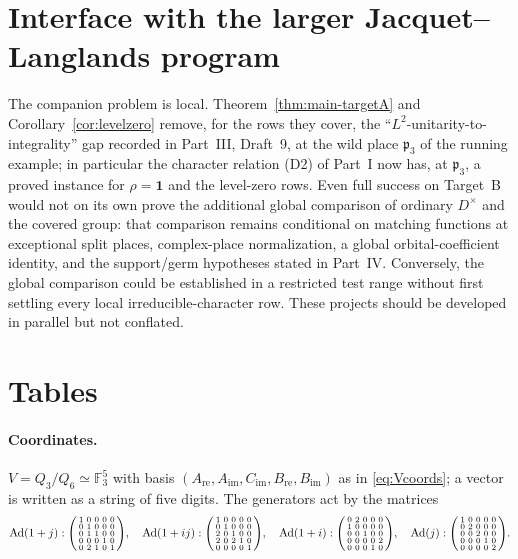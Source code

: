\documentclass[11pt]{article}
\newcommand{\Fq}{\mathbb F}
\newcommand{\Ad}{\operatorname{Ad}}
\newcommand{\pfr}{\mathfrak p}
\theoremstyle{plain}
\theoremstyle{definition}
\begin{document}
\section{Interface with the larger Jacquet--Langlands program}
The companion problem is local.  Theorem~\ref{thm:main-targetA} and
Corollary~\ref{cor:levelzero} remove, for the rows they cover, the
``$L^2$-unitarity-to-integrality'' gap recorded in Part~III, Draft~9,
at the wild place $\pfr_3$ of the running example; in particular the
character relation (D2) of Part~I now has, at $\pfr_3$, a proved
instance for $\rho=\mathbf1$ and the level-zero rows.  Even full
success on Target~B would not on its own prove the additional global
comparison of ordinary $D^\times$ and the covered group: that comparison
remains conditional on matching functions at exceptional split places,
complex-place normalization, a global orbital-coefficient identity,
and the support/germ hypotheses stated in Part~IV.  Conversely, the
global comparison could be established in a restricted test range
without first settling every local irreducible-character row.  These
projects should be developed in parallel but not conflated.

\appendix
\section{Tables}\label{app:tables}
\paragraph{Coordinates.}  $V=Q_3/Q_6\simeq\Fq_3^5$ with basis
$(A_{\mathrm{re}},A_{\mathrm{im}},C_{\mathrm{im}},B_{\mathrm{re}},B_{\mathrm{im}})$
as in \eqref{eq:Vcoords}; a vector is written as a string of five
digits.  The generators act by the matrices
\[
\Ad(1+j):\begin{psmallmatrix}1&0&0&0&0\\0&1&0&0&0\\0&1&1&0&0\\0&0&0&1&0\\0&2&1&0&1\end{psmallmatrix},\quad
\Ad(1+ij):\begin{psmallmatrix}1&0&0&0&0\\0&1&0&0&0\\2&0&1&0&0\\2&0&2&1&0\\0&0&0&0&1\end{psmallmatrix},\quad
\Ad(1+i):\begin{psmallmatrix}0&2&0&0&0\\1&0&0&0&0\\0&0&1&0&0\\0&0&0&0&2\\0&0&0&1&0\end{psmallmatrix},\quad
\Ad(j):\begin{psmallmatrix}1&0&0&0&0\\0&2&0&0&0\\0&0&2&0&0\\0&0&0&1&0\\0&0&0&0&2\end{psmallmatrix}.
\]
\end{document}
